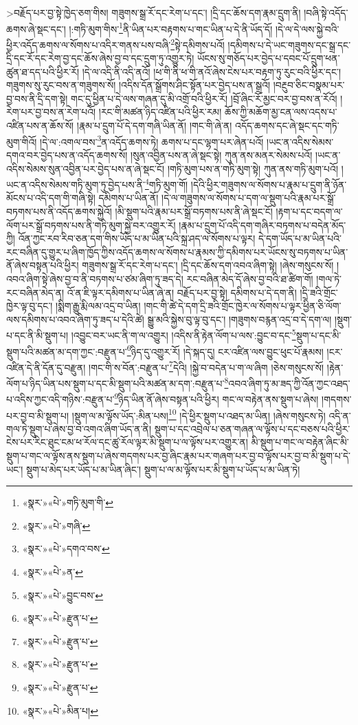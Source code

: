 >བརྗོད་པར་བྱ་སྟེ་ཁྱེད་ཅག་གིས། གཟུགས་སྒྲ་རོ་དང་རེག་པ་དང་། །དྲི་དང་ཆོས་དག་རྣམ་དྲུག་ནི། །བཞི་སྟེ་འདོད་ཆགས་ཞེ་སྡང་དང་། །:གཏི་མུག་གིས་\footnote{«སྣར་»«པེ་»གཏི་མུག་གི་}ནི་ཡིན་པར་བརྟགས་པ་གང་ཡིན་པ་དེ་ནི་ཡོད་དོ། །དེ་ལ་དེ་ལས་སྐྱེ་བའི་ཕྱིར་འདོད་ཆགས་ལ་སོགས་པ་འདིར་གནས་པས་བཞི་\footnote{«སྣར་»«པེ་»གཞི་}སྟེ་དམིགས་པའོ། །དམིགས་པ་དེ་ཡང་གཟུགས་དང་སྒྲ་དང་དྲི་དང་རོ་དང་རེག་བྱ་དང་ཆོས་ཞེས་བྱ་བ་དང་དྲུག་ཏུ་འགྱུར་ཏེ། ཡོངས་སུ་གཅོད་པར་བྱེད་པ་དབང་པོ་དྲུག་ཕན་ཚུན་ཐ་དད་པའི་ཕྱིར་རོ། །དེ་ལ་འདི་ནི་འདི་ནའོ། །ཕ་གི་ནི་ཕ་གི་ནའོ་ཞེས་ངེས་པར་བརྟག་ཏུ་རུང་བའི་ཕྱིར་དང་། གཟུགས་སུ་རུང་བས་ན་གཟུགས་སོ། །འདིས་དོན་སྒྲོགས་ཤིང་སྟོན་པར་བྱེད་པས་ན་སྒྲའོ། །བརྔུབ་ཅིང་བསྣམ་པར་བྱ་བས་ནི་དྲི་དག་སྟེ། གང་དུ་ཕྱིན་པ་དེ་ལས་གཞན་དུ་མི་འགྲོ་བའི་ཕྱིར་རོ། །བྲོ་ཞིང་རོ་མྱང་བར་བྱ་བས་ན་རོའོ། །རེག་པར་བྱ་བས་ན་རེག་པའོ། །རང་གི་མཚན་ཉིད་འཛིན་པའི་ཕྱིར་རམ། ཆོས་ཀྱི་མཆོག་མྱ་ངན་ལས་འདས་པ་འཛིན་པས་ན་ཆོས་སོ། །རྣམ་པ་དྲུག་པོ་དེ་དག་གཞི་ཡིན་ནོ། །གང་གི་ཞེ་ན། འདོད་ཆགས་དང་ཞེ་སྡང་དང་གཏི་མུག་གིའོ། །དེ་ལ་:འགལ་བས་\footnote{«སྣར་»«པེ་»དགའ་བས་}ན་འདོད་ཆགས་ཏེ། ཆགས་པ་དང་ལྷག་པར་ཞེན་པའོ། །ཡང་ན་འདིས་སེམས་དགའ་བར་བྱེད་པས་ན་འདོད་ཆགས་སོ། །སུན་འབྱིན་པས་ན་ཞེ་སྡང་སྟེ། ཀུན་ནས་མནར་སེམས་པའོ། །ཡང་ན་འདིས་སེམས་སུན་འབྱིན་པར་བྱེད་པས་ན་ཞེ་སྡང་ངོ། །གཏི་མུག་པས་ན་གཏི་མུག་སྟེ། ཀུན་ནས་གཏི་མུག་པའོ། །ཡང་ན་འདིས་སེམས་གཏི་མུག་ཏུ་བྱེད་པས་ནི་\footnote{«སྣར་»«པེ་»ན་}གཏི་མུག་གོ། །དེའི་ཕྱིར་གཟུགས་ལ་སོགས་པ་རྣམ་པ་དྲུག་ནི་ཉོན་མོངས་པ་འདི་དག་གི་གཞི་སྟེ། དམིགས་པ་ཡིན་ནོ། །དེ་ལ་གཟུགས་ལ་སོགས་པ་དག་ལ་སྡུག་པའི་རྣམ་པར་སྒྲོ་བཏགས་པས་ནི་འདོད་ཆགས་སྐྱེའོ། །མི་སྡུག་པའི་རྣམ་པར་སྒྲོ་བཏགས་པས་ནི་ཞེ་སྡང་ངོ། །རྟག་པ་དང་བདག་ལ་ལོག་པར་སྒྲོ་བཏགས་པས་ནི་གཏི་མུག་སྐྱེ་བར་འགྱུར་རོ། །རྣམ་པ་དྲུག་པོ་འདི་དག་གཞིར་བཏགས་པ་བདེན་མོད་ཀྱི། འོན་ཀྱང་རབ་རིབ་ཅན་དག་གིས་ཡོད་པ་མ་ཡིན་པའི་སྐྲ་ཤད་ལ་སོགས་པ་ལྟར། དེ་དག་ཡོད་པ་མ་ཡིན་པའི་རང་བཞིན་དུ་གྱུར་པ་ཞིག་ཁྱོད་ཀྱིས་འདོད་ཆགས་ལ་སོགས་པ་རྣམས་ཀྱི་དམིགས་པར་ཡོངས་སུ་བཏགས་པ་ཡིན་ནོ་ཞེས་བསྟན་པའི་ཕྱིར། གཟུགས་སྒྲ་རོ་དང་རེག་པ་དང་། །དྲི་དང་ཆོས་དག་འབའ་ཞིག་སྟེ། །ཞེས་གསུངས་སོ། །འབའ་ཞིག་སྟེ་ཞེས་བྱ་བ་ནི་བཏགས་པ་ཙམ་ཞིག་ཏུ་ཟད་དེ། རང་བཞིན་མེད་དོ་ཞེས་བྱ་བའི་ཐ་ཚིག་གོ། །གལ་ཏེ་རང་བཞིན་མེད་ན། འོ་ན་ཇི་ལྟར་དམིགས་པ་ཡིན་ཞེ་ན། བརྗོད་པར་བྱ་སྟེ། དམིགས་པ་དེ་དག་ནི། །དྲི་ཟའི་གྲོང་ཁྱེར་ལྟ་བུ་དང་། །སྨིག་རྒྱུ་རྨི་ལམ་འདྲ་བ་ཡིན། །གང་གི་ཚེ་དེ་དག་དྲི་ཟའི་གྲོང་ཁྱེར་ལ་སོགས་པ་ལྟར་ཕྱིན་ཅི་ལོག་ལས་དམིགས་པ་འབའ་ཞིག་ཏུ་ཟད་པ་དེའི་ཚེ། སྒྱུ་མའི་སྐྱེས་བུ་ལྟ་བུ་དང་། །གཟུགས་བརྙན་འདྲ་བ་དེ་དག་ལ། །སྡུག་པ་དང་ནི་མི་སྡུག་པ། །འབྱུང་བར་ཡང་ནི་ག་ལ་འགྱུར། །འདིས་ནི་རྟེན་ལོག་པ་ལས་:བྱུང་བ་དང་\footnote{«སྣར་»«པེ་»བྱུང་བས་}སྡུག་པ་དང་མི་སྡུག་པའི་མཚན་མ་དག་ཀྱང་:བརྫུན་པ་\footnote{«སྣར་»«པེ་»རྫུན་པ་}ཉིད་དུ་འགྱུར་རོ། །དེ་སྐད་དུ། ངར་འཛིན་ལས་བྱུང་ཕུང་པོ་རྣམས། །ངར་འཛིན་དེ་ནི་དོན་དུ་བརྫུན། །གང་གི་ས་བོན་:བརྫུན་པ་\footnote{«སྣར་»«པེ་»རྫུན་པ་}དེའི། །སྐྱེ་བ་བདེན་པ་ག་ལ་ཞིག །ཅེས་གསུངས་སོ། །རྟེན་ལོག་པ་ཉིད་ཡིན་པས་སྡུག་པ་དང་མི་སྡུག་པའི་མཚན་མ་དག་:བརྫུན་པ་\footnote{«སྣར་»«པེ་»རྫུན་པ་}འབའ་ཞིག་ཏུ་མ་ཟད་ཀྱི་འོན་ཀྱང་འཐད་པ་འདིས་ཀྱང་འདི་གཉིས་:བརྫུན་པ་\footnote{«སྣར་»«པེ་»རྫུན་པ་}ཉིད་ཡིན་ནོ་ཞེས་བསྟན་པའི་ཕྱིར། གང་ལ་བརྟེན་ནས་སྡུག་པ་ཞེས། །གདགས་པར་བྱ་བ་མི་སྡུག་པ། །སྡུག་ལ་མ་ལྟོས་ཡོད་:མིན་པས།\footnote{«སྣར་»«པེ་»མིན་པ།} །དེ་ཕྱིར་སྡུག་པ་འཐད་མ་ཡིན། །ཞེས་གསུངས་ཏེ། འདི་ན་གལ་ཏེ་སྡུག་པ་ཞེས་བྱ་བ་འགའ་ཞིག་ཡོད་ན་ནི། སྡུག་པ་དང་འབྲེལ་པ་ཅན་གཞན་ལ་ལྟོས་པ་དང་བཅས་པའི་ཕྱིར་ངེས་པར་རིང་ཐུང་ངམ་ཕ་རོལ་དང་ཚུ་རོལ་ལྟར་མི་སྡུག་པ་ལ་ལྟོས་པར་འགྱུར་ན། མི་སྡུག་པ་གང་ལ་བརྟེན་ཞིང་མི་སྡུག་པ་གང་ལ་ལྟོས་ནས་སྡུག་པ་ཞེས་གདགས་པར་བྱ་ཞིང་རྣམ་པར་གཞག་པར་བྱ་བ་ལྟོས་པར་བྱ་བ་མི་སྡུག་པ་དེ་ཡང་། སྡུག་པ་མེད་པར་ཡོད་པ་མ་ཡིན་ཞིང་། སྡུག་པ་ལ་མ་ལྟོས་པར་མི་སྡུག་པ་ཡོད་པ་མ་ཡིན་ཏེ། 